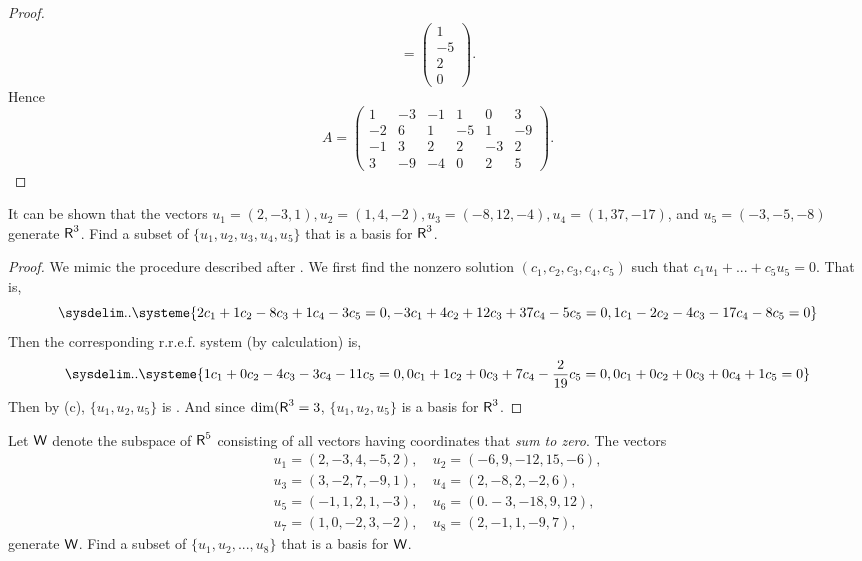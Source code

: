 \begin{proof}
\[        = \begin{pmatrix} 1 \\ -5 \\ 2 \\ 0 \end{pmatrix}.
\]
Hence
\[
    A = \left(\begin{array}{cccccc}
        1 & -3 & -1 & 1 & 0 & 3 \\
        -2 & 6 & 1 & -5 & 1 & -9 \\
        -1 & 3 & 2 & 2 & -3 & 2 \\
        3 & -9 & -4 & 0 & 2 & 5
    \end{array}\right).
\]
\end{proof}

\begin{exercise} \label{exercise 3.4.7}
\sloppy It can be shown that the vectors \(u_1 = (2, -3, 1), u_2 = (1, 4, -2), u_3 = (-8, 12, -4), u_4 = (1, 37, -17)\), and \(u_5 = (-3, -5, -8)\) generate \(\textsf{R}^3\).
Find a subset of \(\{ u_1, u_2, u_3, u_4, u_5 \}\) that is a basis for \(\textsf{R}^3\).
\end{exercise}

\begin{proof}
We mimic the procedure described after .
We first find the nonzero solution \((c_1, c_2, c_3, c_4, c_5)\) such that \(c_1 u_1 + ... + c_5 u_5 = 0\).
That is,
\[
    \sysdelim..\systeme{
         2 c_1 + 1 c_2 -  8 c_3 +  1 c_4 - 3 c_5 = 0,
        -3 c_1 + 4 c_2 + 12 c_3 + 37 c_4 - 5 c_5 = 0,
         1 c_1 - 2 c_2 -  4 c_3 - 17 c_4 - 8 c_5 = 0
    }
\]
Then the corresponding r.r.e.f. system (by calculation) is,
\[
    \sysdelim..\systeme{
         1 c_1 + 0 c_2 - 4 c_3 - 3 c_4 -           11 c_5 = 0,
         0 c_1 + 1 c_2 + 0 c_3 + 7 c_4 - \frac{2}{19} c_5 = 0,
         0 c_1 + 0 c_2 + 0 c_3 + 0 c_4 +            1 c_5 = 0
    }
\]
\sloppy Then by (c), \(\{ u_1, u_2, u_5 \}\) is \LID{}.
And since \(\dim(\textsf{R}^3 = 3\), \(\{ u_1, u_2, u_5 \}\) is a basis for \(\textsf{R}^3\).
\end{proof}

\begin{exercise} \label{exercise 3.4.8}
Let \(\textsf{W}\) denote the subspace of \(\textsf{R}^5\) consisting of all vectors having coordinates that \emph{sum to zero}.
The vectors
\begin{align*}
    u_1 = (2, -3, 4, -5, 2), &\ u_2 = (-6, 9, -12, 15, -6), \\
    u_3 = (3, -2, 7, -9, 1), &\ u_4 = (2, -8, 2, -2, 6), \\
    u_5 = (-1, 1, 2, 1, -3), &\ u_6 = (0. -3, -18, 9, 12), \\
    u_7 = (1, 0, -2, 3, -2), &\ u_8 = (2, -1, 1, -9, 7),
\end{align*}
generate \(\textsf{W}\).
Find a subset of \(\{ u_1, u_2, ..., u_8 \}\) that is a basis for \(\textsf{W}\).
\end{exercise}

